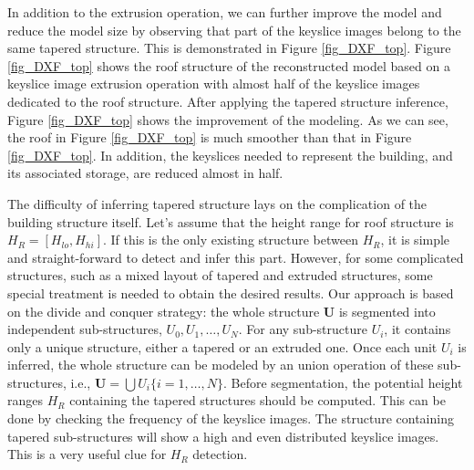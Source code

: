 \documentclass[12pt,letterpaper]{article}
\begin{document}
In addition to the extrusion operation, we can further improve the model
and reduce the model size by observing that part of the keyslice images
belong to the same tapered structure.
This is demonstrated in Figure \ref{fig_DXF_top}.
Figure \ref{fig_DXF_top} shows the roof structure
of the reconstructed model based on a keyslice image extrusion operation with
almost half of the keyslice images dedicated to the roof structure.
After applying the tapered structure inference,
Figure \ref{fig_DXF_top}
shows the improvement of the modeling.
As we can see, the roof in Figure \ref{fig_DXF_top}
is much smoother than that in Figure \ref{fig_DXF_top}.
In addition, the keyslices needed to represent the building, and its
associated storage, are reduced almost in half.

The difficulty of inferring tapered structure lays on the complication of
the building structure itself.
Let's assume that the height range for roof structure is
$H_R = [H_{lo}, H_{hi}]$.
If this is the only existing structure between $H_R$, it is simple and
straight-forward to detect and infer this part.
However, for some complicated structures, such as a mixed layout
of tapered and extruded structures, some special treatment is needed to obtain
the desired results.
Our approach is based on the divide and conquer strategy: the whole
structure $\boldsymbol{U}$ is segmented into independent sub-structures,
$U_0, U_1, \ldots, U_N$. For any sub-structure $U_i$,
it contains only a unique structure, either a tapered or an extruded one. Once
each unit $U_i$ is inferred, the whole structure can be modeled by an union operation
of these sub-structures, i.e., $\boldsymbol{U} = \bigcup{U_i\{ i = 1,\ldots,N\}}$.
Before segmentation, the potential height ranges $H_R$ containing the tapered structures should be computed.
This can be done by checking the frequency of the keyslice images.
The structure containing tapered sub-structures will show a high and even
distributed keyslice images. This is a very useful clue for $H_R$ detection.
\end{document}
